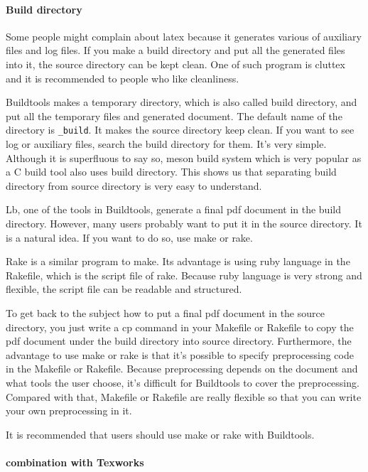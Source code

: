 \hypertarget{build-directory}{%
\paragraph{Build directory}\label{build-directory}}

Some people might complain about latex because it generates various of
auxiliary files and log files. If you make a build directory and put all
the generated files into it, the source directory can be kept clean. One
of such program is cluttex and it is recommended to people who like
cleanliness.

Buildtools makes a temporary directory, which is also called build
directory, and put all the temporary files and generated document. The
default name of the directory is \texttt{\_build}. It makes the source
directory keep clean. If you want to see log or auxiliary files, search
the build directory for them. It's very simple. Although it is
superfluous to say so, meson build system which is very popular as a C
build tool also uses build directory. This shows us that separating
build directory from source directory is very easy to understand.

Lb, one of the tools in Buildtools, generate a final pdf document in the
build directory. However, many users probably want to put it in the
source directory. It is a natural idea. If you want to do so, use make
or rake.

Rake is a similar program to make. Its advantage is using ruby language
in the Rakefile, which is the script file of rake. Because ruby language
is very strong and flexible, the script file can be readable and
structured.

To get back to the subject how to put a final pdf document in the source
directory, you just write a cp command in your Makefile or Rakefile to
copy the pdf document under the build directory into source directory.
Furthermore, the advantage to use make or rake is that it's possible to
specify preprocessing code in the Makefile or Rakefile. Because
preprocessing depends on the document and what tools the user choose,
it's difficult for Buildtools to cover the preprocessing. Compared with
that, Makefile or Rakefile are really flexible so that you can write
your own preprocessing in it.

It is recommended that users should use make or rake with Buildtools.

\hypertarget{combination-with-texworks}{%
\paragraph{combination with Texworks}\label{combination-with-texworks}}


